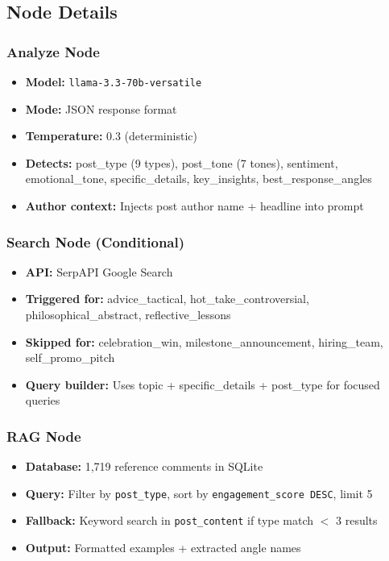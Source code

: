 \documentclass[12pt,a4paper]{article}
\begin{document}
\subsection{Node Details}

\subsubsection{Analyze Node}
\begin{itemize}[leftmargin=1.5em]
    \item \textbf{Model:} \texttt{llama-3.3-70b-versatile}
    \item \textbf{Mode:} JSON response format
    \item \textbf{Temperature:} 0.3 (deterministic)
    \item \textbf{Detects:} post\_type (9 types), post\_tone (7 tones), sentiment, emotional\_tone, specific\_details, key\_insights, best\_response\_angles
    \item \textbf{Author context:} Injects post author name + headline into prompt
\end{itemize}

\subsubsection{Search Node (Conditional)}
\begin{itemize}[leftmargin=1.5em]
    \item \textbf{API:} SerpAPI Google Search
    \item \textbf{Triggered for:} advice\_tactical, hot\_take\_controversial, philosophical\_abstract, reflective\_lessons
    \item \textbf{Skipped for:} celebration\_win, milestone\_announcement, hiring\_team, self\_promo\_pitch
    \item \textbf{Query builder:} Uses topic + specific\_details + post\_type for focused queries
\end{itemize}

\subsubsection{RAG Node}
\begin{itemize}[leftmargin=1.5em]
    \item \textbf{Database:} 1,719 reference comments in SQLite
    \item \textbf{Query:} Filter by \texttt{post\_type}, sort by \texttt{engagement\_score DESC}, limit 5
    \item \textbf{Fallback:} Keyword search in \texttt{post\_content} if type match $<$ 3 results
    \item \textbf{Output:} Formatted examples + extracted angle names
\end{itemize}
\end{document}
